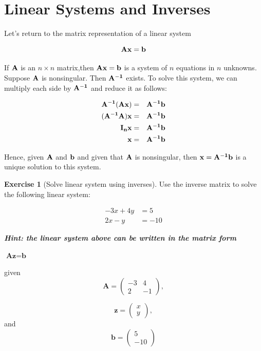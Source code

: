 \documentclass[
]{book}
\theoremstyle{definition}
\theoremstyle{definition}
\theoremstyle{definition}
\newtheorem{exercise}{Exercise}[chapter]
\theoremstyle{definition}
\theoremstyle{remark}
\begin{document}
\hypertarget{linear-systems-and-inverses}{%
\section{Linear Systems and Inverses}\label{linear-systems-and-inverses}}

Let's return to the matrix representation of a linear system

\[\bf{Ax} = \bf{b}\]

If \(\bf{A}\) is an \(n\times n\) matrix,then \(\bf{Ax}=\bf{b}\) is a system of \(n\) equations in \(n\) unknowns. Suppose \(\bf{A}\) is nonsingular. Then \(\bf{A}^{-1}\) exists. To solve this system, we can multiply each side by \(\bf{A}^{-1}\) and reduce it as follows:

\begin{eqnarray*} 
\bf{A}^{-1} (\bf{A} \bf{x}) & = & \bf{A}^{-1} \bf{b} \\
(\bf{A}^{-1} \bf{A})\bf{x} & = & \bf{A}^{-1} \bf{b}\\
\bf{I}_n \bf{x}     & = & \bf{A}^{-1} \bf{b}\\
\bf{x} & = & \bf{A}^{-1} \bf{b}
\end{eqnarray*}

Hence, given \(\bf{A}\) and \(\bf{b}\) and given that \(\bf{A}\) is nonsingular, then \(\bf{x} = \bf{A}^{-1} \bf{b}\) is a unique solution to this system.

\begin{exercise}[Solve linear system using inverses]
\protect\hypertarget{exr:invlinsys}{}{\label{exr:invlinsys} {} }
Use the inverse matrix to solve the following linear system:

\begin{align*} 
-3x + 4y &= 5 \\
2x - y &= -10
\end{align*}

\textbf{\emph{Hint: the linear system above can be written in the matrix form}}

\(\textbf{A}\textbf{z} = \textbf{b}\)

given \[\textbf{A} = \begin{pmatrix} -3&4\\2&-1 \end{pmatrix},\]

\[\textbf{z} = \begin{pmatrix} x\\y \end{pmatrix},\]
and
\[\textbf{b} = \begin{pmatrix} 5\\-10 \end{pmatrix}\]
\end{exercise}
\end{document}
